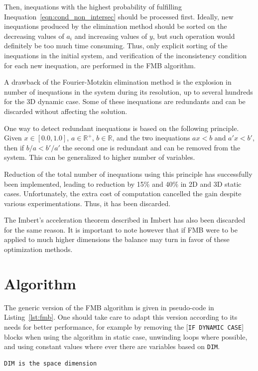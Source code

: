 \documentclass[12pt, a4paper]{article}
\begin{document}
\begin{itemize}
Then, inequations with the highest probability of fulfilling Inequation~\ref{eqn:cond_non_intersec} should be processed first. Ideally, new inequations produced by the elimination method should be sorted on the decreasing values of $a_i$ and increasing values of $y$, but such operation would definitely be too much time consuming. Thus, only explicit sorting of the inequations in the initial system, and verification of the inconsistency condition for each new inequation, are performed in the FMB algorithm.

A drawback of the Fourier-Motzkin elimination method is the explosion in number of inequations in the system during its resolution, up to several hundreds for the 3D dynamic case. Some of these inequations are redundants and can be discarded without affecting the solution.

One way to detect redundant inequations is based on the following principle. Given $x\in[0.0,1.0]$, $a\in\mathbb{R^+}$, $b\in\mathbb{R}$, and the two inequations $ax<b$ and $a'x<b'$, then if $b/a<b'/a'$ the second one is redundant and can be removed from the system. This can be generalized to higher number of variables.

Reduction of the total number of inequations using this principle has successfully been implemented, leading to reduction by 15\% and 40\% in 2D and 3D static cases. Unfortunately, the extra cost of computation cancelled the gain despite various experimentations. Thus, it has been discarded.

The Imbert's acceleration theorem described in Imbert \cite{Imbert1990AboutRI} has also been discarded for the same reason. It is important to note however that if FMB were to be applied to much higher dimensions the balance may turn in favor of these optimization methods.

\section{Algorithm}
\label{sec:algorithm}

The generic version of the FMB algorithm is given in pseudo-code in Listing~\ref{lst:fmb}. One should take care to adapt this version according to its needs for better performance, for example by removing the [\lstinline{IF DYNAMIC CASE}] blocks when using the algorithm in static case, unwinding loops where possible, and using constant values where ever there are variables based on \lstinline{DIM}.

\begin{lstlisting}[breaklines, caption={The FMB algorithm.}, label={lst:fmb}]
DIM is the space dimension


\end{lstlisting}
\end{itemize}
\end{document}
